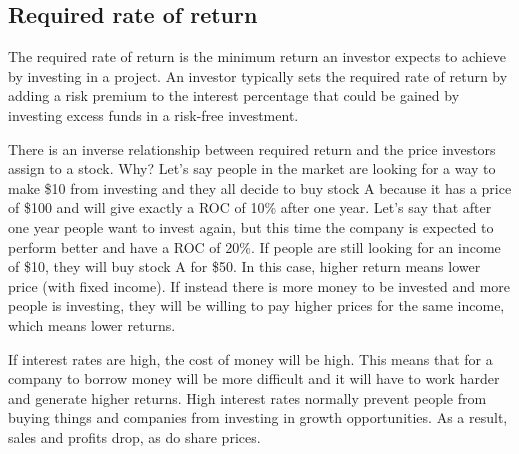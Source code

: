 \subsection{Required rate of return}
The required rate of return is the minimum return an investor expects to achieve by investing in a project. An investor typically sets the required rate of return by adding a risk premium to the interest percentage that could be gained by investing excess funds in a risk-free investment.

There is an inverse relationship between required return and the price investors assign to a stock. Why? Let's say people in the market are looking for a way to make \$10 from investing and they all decide to buy stock A because it has a price of \$100 and will give exactly a ROC of 10\% after one year. Let's say that after one year people want to invest again, but this time the company is expected to perform better and have a ROC of 20\%. If people are still looking for an income of \$10, they will buy stock A for \$50. In this case, higher return means lower price (with fixed income). If instead there is more money to be invested and more people is investing, they will be willing to pay higher prices for the same income, which means lower returns. 

If interest rates are high, the cost of money will be high. This means that for a company to borrow money will be more difficult and it will have to work harder and generate higher returns. High interest rates normally prevent people from buying things and companies from investing in growth opportunities. As a result, sales and profits drop, as do share prices.

